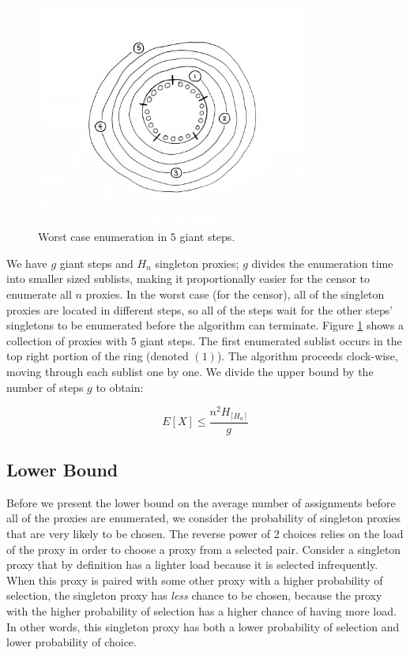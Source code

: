 \begin{figure}[h!]
\centering
     \includegraphics[width=0.8\textwidth]{fig/planets.png}
    \caption{Worst case enumeration in $5$ giant steps.}

    \label{fig:ubgs}
\end{figure}

We have $g$ giant steps and $H_n$ singleton proxies; $g$ divides the enumeration time into smaller sized sublists, making it proportionally easier for the censor to enumerate all $n$ proxies. In the worst case (for the censor), all of the singleton proxies are located in different steps, so all of the steps wait for the other steps' singletons to be enumerated before the algorithm can terminate. Figure \ref{fig:ubgs} shows a collection of proxies with $5$ giant steps. The first enumerated sublist occurs in the top right portion of the ring (denoted $(1)$). The algorithm proceeds clock-wise, moving through each sublist one by one. We divide the upper bound by the number of steps $g$ to obtain:

$$E[X] \leq \frac{ n^2H_{\lceil{H_n}\rceil}}{g}$$


\subsection{Lower Bound}
Before we present the lower bound on the average number of assignments before all of the proxies are enumerated, we consider the probability of singleton proxies that are very likely to be chosen. The reverse power of 2 choices relies on the load of the proxy in order to choose a proxy from a selected pair. Consider a singleton proxy that by definition has a lighter load because it is selected infrequently. When this proxy is paired with some other proxy with a higher probability of selection, the singleton proxy has \textit{less} chance to be chosen, because the proxy with the higher probability of selection has a higher chance of having more load. In other words, this singleton proxy has both a lower probability of selection and lower probability of choice. 

